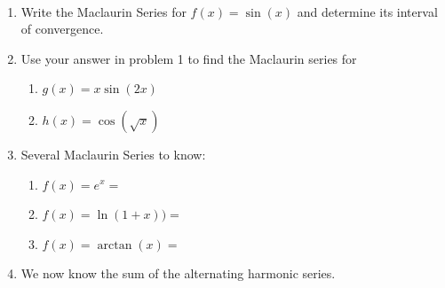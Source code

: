 \documentclass[11pt]{amsart}
\begin{document}
\begin{center}
  \large
  \\
  
\end{center}

\begin{enumerate}
\item Write the Maclaurin Series for $f(x) = \sin(x)$ and determine its interval of convergence.
\vfill
\vfill
\item Use your answer in problem 1 to find the Maclaurin series for\\

	\begin{enumerate}
	\item $g(x)=x\sin(2x)$
	\vfill
	\item $h(x)= \cos(\sqrt{x})$
	\vfill
	\vfill
	\end{enumerate}
\newpage
\item Several Maclaurin Series to know:
	\begin{enumerate}
	\item $f(x)=e^x=$
	\vskip 0.7in
	\item $f(x)= \ln(1+x))=$
	\vskip 0.7in
	\item $f(x)=\arctan(x)=$
	\vskip 0.7in
	\end{enumerate}
\item We now know the sum of the alternating harmonic series.
\end{enumerate}
\end{document}
